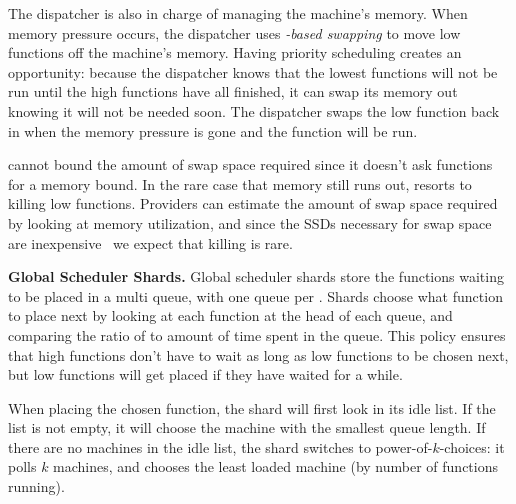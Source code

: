 The dispatcher is also in charge of managing the machine's memory. When memory
pressure occurs, the dispatcher uses \textit{\class{}-based swapping} to move
low \class{} functions off the machine's memory. Having priority scheduling
creates an opportunity: because the dispatcher knows that the lowest \class{}
functions will not be run until the high \class{} functions have all finished,
it can swap its memory out knowing it will not be needed soon. The dispatcher
swaps the low \class{} function back in when the memory pressure is gone and the
function will be run.

\Sys{} cannot bound the amount of swap space required since it doesn't ask
functions for a memory bound.  In the rare case that memory still runs out,
\sys{} resorts to killing low \class{} functions.  Providers can estimate the
amount of swap space required by looking at memory utilization, and since the
SSDs necessary for swap space are inexpensive~\cite{ssd-price} we expect that
killing is rare.

\textbf{Global Scheduler Shards.}
Global scheduler shards store the functions waiting to be placed in a multi
queue, with one queue per \priceclass{}. Shards choose what function to place
next by looking at each function at the head of each queue, and comparing the
ratio of \class{} to amount of time spent in the queue. This policy ensures
that high \class{} functions don't have to wait as long as low \class{}
functions to be chosen next, but low \class{} functions will get placed if they
have waited for a while.

When placing the chosen function, the shard will first look in its
idle list. If the list is not empty, it will choose the machine with
the smallest queue length.  If there are no machines in the idle list,
the shard switches to power-of-$k$-choices: it polls $k$ machines, and
chooses the least loaded machine (by number of functions running).
